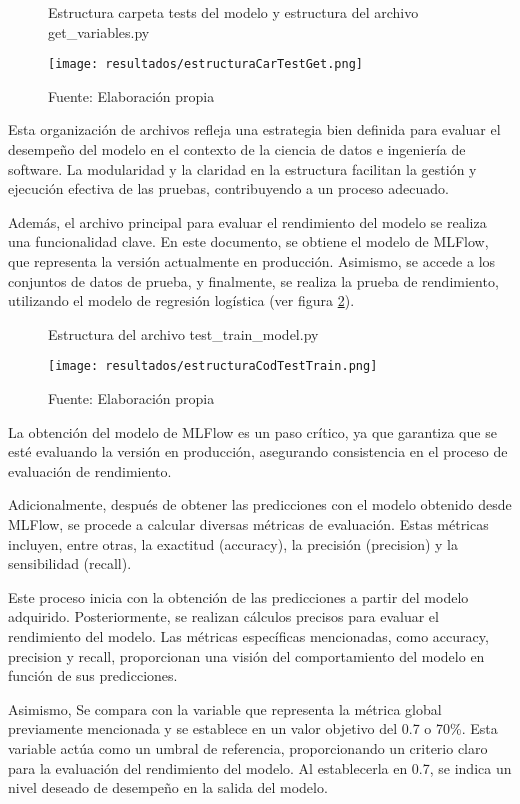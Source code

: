 \begin{figure}[h]
	\centering
	\caption{Estructura carpeta tests del modelo y estructura del archivo get\_variables.py}
	\texttt{[image: resultados/estructuraCarTestGet.png]}
	\caption*{\footnotesize Fuente: Elaboración propia}
	\label{fig:figuraEstructuraCarTestGet}
\end{figure}

Esta organización de archivos refleja una estrategia bien definida para evaluar el desempeño del modelo en el contexto de la ciencia de datos e ingeniería de software. La modularidad y la claridad en la estructura facilitan la gestión y ejecución efectiva de las pruebas, contribuyendo a un proceso adecuado.

Además, el archivo principal para evaluar el rendimiento del modelo se realiza una funcionalidad clave. En este documento, se obtiene el modelo de MLFlow, que representa la versión actualmente en producción. Asimismo, se accede a los conjuntos de datos de prueba, y finalmente, se realiza la prueba de rendimiento, utilizando el modelo de regresión logística (ver figura \ref{fig:figuraEstructuraCodTestTrain}).

\newpage

\begin{figure}[h]
	\centering
	\caption{Estructura del archivo test\_train\_model.py}
	\texttt{[image: resultados/estructuraCodTestTrain.png]}
	\caption*{\footnotesize Fuente: Elaboración propia}
	\label{fig:figuraEstructuraCodTestTrain}
\end{figure}

La obtención del modelo de MLFlow es un paso crítico, ya que garantiza que se esté evaluando la versión en producción, asegurando consistencia en el proceso de evaluación de rendimiento.

Adicionalmente, después de obtener las predicciones con el modelo obtenido desde MLFlow, se procede a calcular diversas métricas de evaluación. Estas métricas incluyen, entre otras, la exactitud (accuracy), la precisión (precision) y la sensibilidad (recall).

Este proceso inicia con la obtención de las predicciones a partir del modelo adquirido. Posteriormente, se realizan cálculos precisos para evaluar el rendimiento del modelo. Las métricas específicas mencionadas, como accuracy, precision y recall, proporcionan una visión del comportamiento del modelo en función de sus predicciones.

Asimismo, Se compara con la variable que representa la métrica global previamente mencionada y se establece en un valor objetivo del 0.7 o 70\%. Esta variable actúa como un umbral de referencia, proporcionando un criterio claro para la evaluación del rendimiento del modelo. Al establecerla en 0.7, se indica un nivel deseado de desempeño en la salida del modelo.

